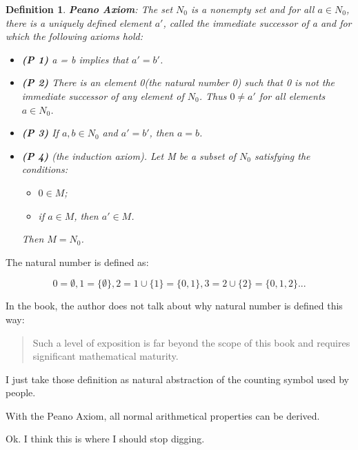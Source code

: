 \documentclass[a4paper]{article}
\newtheorem{definition}{Definition}[section]
\begin{document}
	\begin{definition}
		\textbf{Peano Axiom}: The set $N_0$ is a nonempty set and for all $ a
		\in N_0 $, there is a uniquely defined element $a'$, called the
		immediate successor of a and for which the following axioms hold:
		\begin{itemize}
			\item
				\textbf{(P 1)}  a = b implies that $a' = b'$.
			\item
				\textbf{(P 2)}  There is an element 0(the natural number 0) such
				that 0 is not the immediate successor of any element of $N_0$.
				Thus $0 \neq a'$ for all elements $ a \in N_0 $.
			\item
				\textbf{(P 3)}  If $a,b \in N_0$ and $ a' = b'$, then $a = b$.
			\item
				\textbf{(P 4)}  (the induction axiom). Let M be a subset of $N_0$
				satisfying the conditions:
				\begin{itemize}
					\item $ 0 \in M$;
					\item if $a \in M$, then $a' \in M$.
				\end{itemize}
				Then $ M = N_0 $.
		\end{itemize}
	\end{definition}

	The natural number is defined as\cite{dixon2011algebra}:

	\begin{displaymath}
		0 = \emptyset, 1 = \{\emptyset\}, 2 = 1 \cup \{1\} = \{0, 1\}, 3 = 2 \cup
		\{2\} = \{0, 1, 2\} ...
	\end{displaymath}

	In the book\cite{dixon2011algebra}, the author does not talk about why
	natural number is defined this way:
	\begin{quote}
		Such a level of exposition is far beyond the scope of this book and
		requires significant mathematical maturity.
	\end{quote}

	I just take those definition as natural abstraction of the counting
	symbol used by people.

	With the Peano Axiom, all normal arithmetical properties can be derived.

	Ok. I think this is where I should stop digging.



\end{document}

